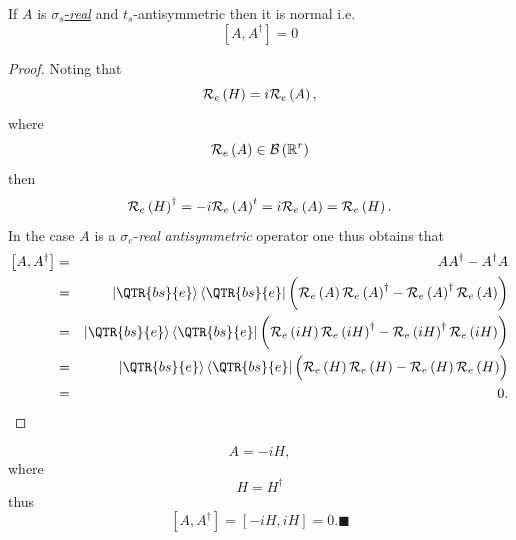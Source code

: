 \begin{lemma}
If $A$ is \underline{$\sigma _{s}$-{\em real}} and $t_{s}$-antisymmetric
then it is normal i.e. 
\begin{equation}
\left[ A,A^{\dagger }\right] =0
\end{equation}

\begin{proof}
Noting that 
\begin{equation}
{\cal R}_{e}\left( H\right) =i{\cal R}_{e}\left( A\right) ,
\end{equation}%
where 
\begin{equation}
{\cal R}_{e}\left( A\right) \in {\cal B}\left( {\Bbb R}^{r}\right) 
\end{equation}%
then 
\begin{equation}
{\cal R}_{e}\left( H\right) ^{\dagger }=-i{\cal R}_{e}\left( A\right) ^{t}=i%
{\cal R}_{e}\left( A\right) ={\cal R}_{e}\left( H\right) .
\end{equation}%
In the case $A$ is a $\sigma _{e}$-{\em real} {\em antisymmetric} operator
one thus obtains that 
\begin{eqnarray}
\left[ A,A^{\dagger }\right]  &=&AA^{\dagger }-A^{\dagger }A \\
&=&\left\vert \QTR{bs}{e}\right\rangle \left\langle \QTR{bs}{e}\right\vert
\left( \stackrel{}{{\cal R}_{e}\left( A\right) {\cal R}_{e}\left( A\right)
^{\dagger }-{\cal R}_{e}\left( A\right) ^{\dagger }{\cal R}_{e}\left(
A\right) }\right)  \\
&=&\left\vert \QTR{bs}{e}\right\rangle \left\langle \QTR{bs}{e}\right\vert
\left( \stackrel{}{{\cal R}_{e}\left( iH\right) {\cal R}_{e}\left( iH\right)
^{\dagger }-{\cal R}_{e}\left( iH\right) ^{\dagger }{\cal R}_{e}\left(
iH\right) }\right)  \\
&=&\left\vert \QTR{bs}{e}\right\rangle \left\langle \QTR{bs}{e}\right\vert
\left( \stackrel{}{{\cal R}_{e}\left( H\right) {\cal R}_{e}\left( H\right) -%
{\cal R}_{e}\left( H\right) {\cal R}_{e}\left( H\right) }\right)  \\
&=&0.
\end{eqnarray}
\end{proof}%
\begin{equation}
A=-iH,
\end{equation}%
where 
\begin{equation}
H=H^{\dagger }
\end{equation}%
thus 
\begin{equation}
\left[ A,A^{\dagger }\right] =\left[ -iH,iH\right] =0.\blacksquare
\end{equation}
\end{lemma}

